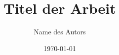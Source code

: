 \author{Name des Autors}
\subject{Masterarbeit}
\title{Titel der Arbeit}
\date{\today}

\makeatletter
\newcommand {\Schlagworte}           {Schlagwort1, Schlagwort2}
\newcommand {\TypDerArbeit}          {Masterarbeit}
\newcommand {\Fakultaet}             {Fakultät für Informatik und Automatisierung}
\newcommand {\Fachgebiet}            {Fachgebiet ABC}
\newcommand {\Professor}             {Prof. XYZ}
\newcommand {\Betreuer}              {Dipl.-Inf. XYZ}
\newcommand {\NameDesAutors}         {\@author}
\newcommand {\Studiengang}           {Informatik}
\newcommand {\eingereichtAm}         {\@date}
\newcommand {\GeburtstagUndOrt}      {01. Januar 1970,\ Amsterdam}
\makeatother
